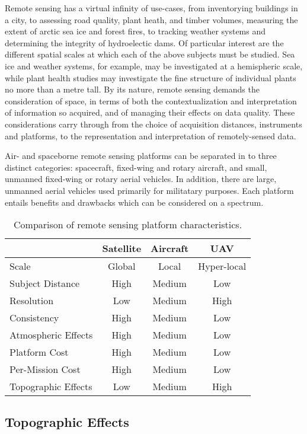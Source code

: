 \documentclass[10pt,a4paper]{report}
\begin{document}
Remote sensing has a virtual infinity of use-cases, from inventorying buildings in a city, to assessing road quality, plant heath, and timber volumes, measuring the extent of arctic sea ice and forest fires, to tracking weather systems  and determining the integrity of hydroelectic dams. Of particular interest are the different spatial scales at which each of the above subjects must be studied. Sea ice and weather systems, for example, may be investigated at a hemispheric scale, while plant health studies may investigate the fine structure of individual plants no more than a metre tall. By its nature, remote sensing demands the consideration of space, in terms of both the contextualization and  interpretation of information so acquired, and of managing their effects on data quality. These considerations carry through from the choice of acquisition distances, instruments and platforms, to the representation and interpretation of remotely-sensed data.

Air- and spaceborne remote sensing platforms can be separated in to three distinct categories: spacecraft, fixed-wing and rotary aircraft, and small, unmanned fixed-wing or rotary aerial vehicles.  In addition, there are large, unmanned aerial vehicles used primarily for militatary purposes. Each platform entails benefits and drawbacks which can be considered on a spectrum.

\begin{table}
\caption{Comparison of remote sensing platform characteristics.}
\label{table:platforms}
\begin{tabular}{l|ccc}
\hline
 & Satellite & Aircraft & UAV \\
\hline
Scale & Global & Local & Hyper-local \\
Subject Distance & High & Medium & Low \\
Resolution & Low & Medium & High \\
Consistency & High & Medium & Low \\
Atmospheric Effects & High & Medium & Low \\
Platform Cost & High & Medium & Low \\
Per-Mission Cost & High & Medium & Low \\
Topographic Effects & Low & Medium & High \\
\hline
\end{tabular}
\end{table}

\subsection{Topographic Effects}
\end{document}
